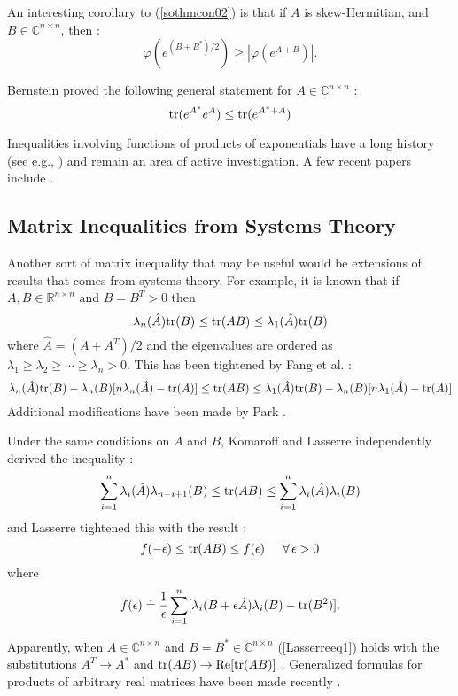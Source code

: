 \documentclass{svmult}
\newcommand{\beq}{ \begin{equation}}
\newcommand{\eeq}{ \end{equation} }
\newcommand{\IR}{\mathbb{R}}
\newcommand{\IC}{\mathbb{C}}
\begin{document}
An interesting corollary to (\ref{sothmcon02}) is that if $A$ is skew-Hermitian, and $B \in \IC^{n\times n}$, then \cite{cohen82}:
\beq
\varphi(e^{(B+B^*)/2}) \geq |\varphi(e^{A+B})|.
\label{ssl33m}
\eeq

Bernstein proved the following general statement for
$A \in \IC^{n\times n}$ \cite{Bernsteingg}:
\beq
{\rm tr}(e^{A^*} e^A) \leq {\rm tr}(e^{A^* + A})
\label{bernform}
\eeq

Inequalities involving functions of products of exponentials
have a long history (see e.g., \cite{fan23,fanref}) and
remain an area of active investigation. A few recent papers include
\cite{Bebiano,FriedlandSo,FriedlandPorta}.

\subsection{Matrix Inequalities from Systems Theory}

Another sort of matrix inequality that may be useful would be
extensions of results that comes from
systems theory. For example, it is known that if
$A, B \in \IR^{n\times n}$ and $B=B^T>0$ then \cite{Mori}
\beq
\lambda_n(\hat{A}) {\rm tr}(B) \leq {\rm tr}(AB) \leq \lambda_1(\hat{A}) {\rm tr}(B)
\label{}
\eeq
where $\hat{A} = (A+A^T)/2$ and the eigenvalues are ordered as
$\lambda_1 \geq \lambda_2 \geq \cdots \geq \lambda_n >0$.
This has been tightened by Fang et al. \cite{Fang}:
\beq
\lambda_n(\hat{A}) {\rm tr}(B)  - \lambda_n(B)[n\lambda_n(\hat{A})
-{\rm tr}(A)]
\leq {\rm tr}(AB) \leq
\lambda_1(\hat{A}) {\rm tr}(B)  - \lambda_n(B)[n\lambda_1(\hat{A})
-{\rm tr}(A)]
\label{}
\eeq
Additional modifications have been made by Park \cite{Parkkwlw}.

Under the same conditions on $A$ and $B$,
Komaroff and Lasserre independently derived the inequality \cite{Komaroff,Lasserre1}:
\beq
\sum_{i=1}^{n} \lambda_i(\hat{A})  \lambda_{n-i+1}(B)
\leq {\rm tr}(AB) \leq  \sum_{i=1}^{n} \lambda_i(\hat{A})  \lambda_{i}(B)
\label{Lasserreeq1}
\eeq
and Lasserre tightened this with the result  \cite{Lasserre2}:
\beq
f(-\epsilon) \leq {\rm tr}(AB) \leq f(\epsilon) \hskip 0.2 true in
\forall \, \epsilon > 0
\label{}
\eeq
where
$$ f(\epsilon) \doteq \frac{1}{\epsilon}
\sum_{i=1}^{n} [\lambda_i(B + \epsilon\hat{A}) \lambda_i(B) -
{\rm tr}(B^2)]. $$

Apparently, when $A \in \IC^{n\times n}$ and $B = B^* \in \IC^{n\times n}$
(\ref{Lasserreeq1}) holds with the substitutions
$A^T \rightarrow A^*$ and
${\rm tr}(AB) \rightarrow {\rm Re}[{\rm tr}(AB)]$ \cite{Zhang}.
Generalized formulas for products of arbitrary real matrices
have been made recently \cite{Xing,Zhang,JianzhouLiu}.
\end{document}
